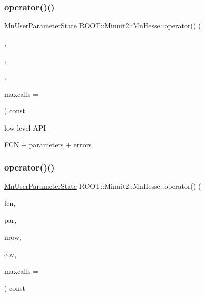 \subsubsection{\texorpdfstring{operator()()}{operator()()}\hspace{0.1cm}{\footnotesize\ttfamily [2/16]}}
{\footnotesize\ttfamily \mbox{\hyperlink{classROOT_1_1Minuit2_1_1MnUserParameterState}{Mn\+User\+Parameter\+State}} R\+O\+O\+T\+::\+Minuit2\+::\+Mn\+Hesse\+::operator() (\begin{DoxyParamCaption}\item[{const \mbox{\hyperlink{classROOT_1_1Minuit2_1_1FCNBase}{F\+C\+N\+Base}} \&}]{,  }\item[{const std\+::vector$<$ double $>$ \&}]{,  }\item[{const std\+::vector$<$ double $>$ \&}]{,  }\item[{unsigned int}]{maxcalls = {} }\end{DoxyParamCaption}) const}

low-\/level A\+PI

F\+CN + parameters + errors \mbox{\label{classROOT_1_1Minuit2_1_1MnHesse_aa02f8d7bd10ea245658c9c1b3e296a45}} 
\subsubsection{\texorpdfstring{operator()()}{operator()()}\hspace{0.1cm}{\footnotesize\ttfamily [3/16]}}
{\footnotesize\ttfamily \mbox{\hyperlink{classROOT_1_1Minuit2_1_1MnUserParameterState}{Mn\+User\+Parameter\+State}} R\+O\+O\+T\+::\+Minuit2\+::\+Mn\+Hesse\+::operator() (\begin{DoxyParamCaption}\item[{const \mbox{\hyperlink{classROOT_1_1Minuit2_1_1FCNBase}{F\+C\+N\+Base}} \&}]{fcn,  }\item[{const std\+::vector$<$ double $>$ \&}]{par,  }\item[{unsigned int}]{nrow,  }\item[{const std\+::vector$<$ double $>$ \&}]{cov,  }\item[{unsigned int}]{maxcalls = {} }\end{DoxyParamCaption}) const}



